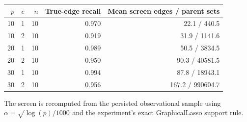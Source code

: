     \begingroup
    \small
    \setlength{\tabcolsep}{5pt}
    \begin{tabular}{rrrrr}
        \hline
        $p$ & $e$ & $n$ & True-edge recall & Mean screen edges / parent sets \\
        \hline
        10 & 1 & 10 & 0.970 & 22.1 / 440.5 \\
        10 & 2 & 10 & 0.919 & 31.9 / 1141.6 \\
        20 & 1 & 10 & 0.989 & 50.5 / 3834.5 \\
        20 & 2 & 10 & 0.950 & 90.3 / 40581.5 \\
        30 & 1 & 10 & 0.994 & 87.8 / 18943.1 \\
        30 & 2 & 10 & 0.956 & 167.2 / 990604.7 \\
        \hline
    \end{tabular}
    \par\smallskip\footnotesize The screen is recomputed from the persisted observational sample using $\alpha=\sqrt{\log(p)/1000}$ and the experiment's exact GraphicalLasso support rule.
    \endgroup
